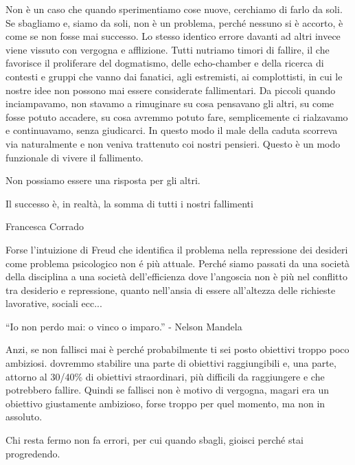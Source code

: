 \documentclass[12pt]{book} %
\begin{document}
\begin{mdframed}[linewidth=1pt]
Non è un caso che quando sperimentiamo cose nuove, cerchiamo di farlo da soli. Se sbagliamo e, siamo da soli, non è un
problema, perché nessuno si è accorto, è come se non fosse mai successo. Lo stesso identico errore davanti ad altri
invece viene vissuto con vergogna e afflizione. Tutti nutriamo timori di fallire, il che favorisce il proliferare del
dogmatismo, delle echo-chamber e della ricerca di contesti e gruppi che vanno dai fanatici, agli estremisti, ai
complottisti, in cui le nostre idee non possono mai essere considerate fallimentari. Da piccoli quando inciampavamo,
non stavamo a rimuginare su cosa pensavano gli altri, su come fosse potuto accadere, su cosa avremmo potuto fare,
semplicemente ci rialzavamo e continuavamo, senza giudicarci. In questo modo il male della caduta scorreva via
naturalmente e non veniva trattenuto coi nostri pensieri. Questo è un modo funzionale di vivere il fallimento.

Non possiamo essere una risposta per gli altri.


\bigskip

Il successo è, in realtà, la somma di tutti i nostri fallimenti

Francesca Corrado


\bigskip

Forse l'intuizione di Freud che identifica il problema nella repressione dei desideri come problema psicologico non é
più attuale. Perché siamo passati da una società della disciplina a una società dell'efficienza dove l'angoscia non è
più nel conflitto tra desiderio e repressione, quanto nell'ansia di essere all'altezza delle richieste lavorative,
sociali ecc...


\bigskip

“Io non perdo mai: o vinco o imparo.” - Nelson Mandela 


\bigskip

Anzi, se non fallisci mai è perché probabilmente ti sei posto obiettivi troppo poco ambiziosi. dovremmo stabilire una
parte di obiettivi raggiungibili e, una parte, attorno al 30/40\% di obiettivi straordinari, più difficili da
raggiungere e che potrebbero fallire. Quindi se fallisci non è motivo di vergogna, magari era un obiettivo giustamente
ambizioso, forse troppo per quel momento, ma non in assoluto. 

Chi resta fermo non fa errori, per cui quando sbagli, gioisci perché stai progredendo.
\end{mdframed}

\bigskip
\end{document}
